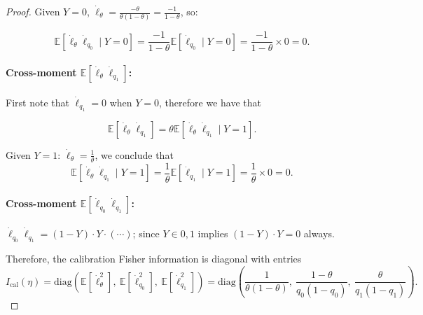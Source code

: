 \begin{proof}
  Given $Y=0$, $\dot\ell_\theta = \frac{-\theta}{\theta(1-\theta)} = \frac{-1}{1-\theta}$, so:

  $$\mathbb{E}[\dot\ell_\theta \dot\ell_{q_0} \mid Y=0] = \frac{-1}{1-\theta}\mathbb{E}[\dot\ell_{q_0} \mid Y=0] = \frac{-1}{1-\theta} \times 0 = 0.$$

\paragraph{Cross-moment $\mathbb{E}[\dot\ell_\theta \dot\ell_{q_1}]$:}
  First note that $\dot\ell_{q_1} = 0$ when $Y=0$, therefore we have that

  $$\mathbb{E}[\dot\ell_\theta \dot\ell_{q_1}] = \theta\mathbb{E}[\dot\ell_\theta \dot\ell_{q_1} \mid Y=1].$$

  Given $Y=1$: $\dot\ell_\theta = \frac{1}{\theta}$, we conclude that
  $$\mathbb{E}[\dot\ell_\theta \dot\ell_{q_1} \mid Y=1] = \frac{1}{\theta}\mathbb{E}[\dot\ell_{q_1} \mid Y=1] = \frac{1}{\theta} \times 0 = 0.$$

\paragraph{Cross-moment $\mathbb{E}[\dot\ell_{q_0} \dot\ell_{q_1}]$:}
  $\dot\ell_{q_0} \dot\ell_{q_1} = (1-Y) \cdot Y \cdot (\cdots)$; since $Y \in 0,1$ implies $(1-Y) \cdot Y = 0$ always. 

Therefore, the calibration Fisher information is diagonal with entries
\[
I_{\mathrm{cal}}(\eta)
=
\mathrm{diag}\!\left(
\mathbb E[\dot\ell_\theta^2],\ \mathbb E[\dot\ell_{q_0}^2],\ \mathbb E[\dot\ell_{q_1}^2]
\right)
=
\mathrm{diag}\!\left(
\frac{1}{\theta(1-\theta)},\
\frac{1-\theta}{q_0(1-q_0)},\
\frac{\theta}{q_1(1-q_1)}
\right).
\]


\end{proof}
